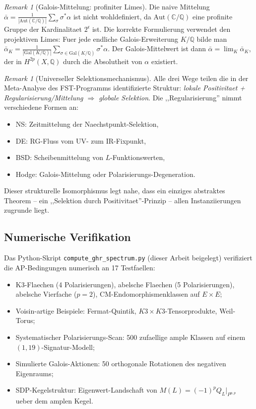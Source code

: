\documentclass[aps,prd,twocolumn,superscriptaddress,nofootinbib]{revtex4-2}
\theoremstyle{definition}
\theoremstyle{remark}
\newtheorem{remark}[theorem]{Remark}
\begin{document}
\begin{remark}[Galois-Mittelung: profiniter Limes]\label{rem:galois-profinite}
Die naive Mittelung $\bar{\alpha} = \frac{1}{|\mathrm{Aut}(\mathbb{C}/\mathbb{Q})|} \sum_\sigma \sigma^*\alpha$ ist nicht wohldefiniert, da $\mathrm{Aut}(\mathbb{C}/\mathbb{Q})$ eine profinite Gruppe der Kardinalitaet $2^{\mathfrak{c}}$ ist. Die korrekte Formulierung verwendet den projektiven Limes: Fuer jede endliche Galois-Erweiterung $K/\mathbb{Q}$ bilde man $\bar{\alpha}_K = \frac{1}{|\mathrm{Gal}(K/\mathbb{Q})|} \sum_{\sigma \in \mathrm{Gal}(K/\mathbb{Q})} \sigma^*\alpha$. Der Galois-Mittelwert ist dann $\bar{\alpha} = \lim_K \bar{\alpha}_K$, der in $H^{2p}(X, \mathbb{Q})$ durch die Absolutheit von $\alpha$ existiert.
\end{remark}

\begin{remark}[Universeller Selektionsmechanismus]
\label{rem:universal-selection}
Alle drei Wege teilen die in der Meta-Analyse des FST-Programms identifizierte Struktur: \emph{lokale Positivitaet + Regularisierung/Mittelung $\Rightarrow$ globale Selektion}. Die ,,Regularisierung'' nimmt verschiedene Formen an:
\begin{itemize}
\item NS: Zeitmittelung der Naechstpunkt-Selektion,
\item DE: RG-Fluss vom UV- zum IR-Fixpunkt,
\item BSD: Scheibenmittelung von $L$-Funktionswerten,
\item Hodge: Galois-Mittelung oder Polarisierungs-Degeneration.
\end{itemize}
Dieser strukturelle Isomorphismus legt nahe, dass ein einziges abstraktes Theorem -- ein ,,Selektion durch Positivitaet''-Prinzip -- allen Instanziierungen zugrunde liegt.
\end{remark}

\subsection{Numerische Verifikation}

Das Python-Skript \texttt{compute\_ghr\_spectrum.py} (dieser Arbeit beigelegt) verifiziert die AP-Bedingungen numerisch an 17 Testfaellen:
\begin{itemize}
\item K3-Flaechen (4 Polarisierungen), abelsche Flaechen (5 Polarisierungen), abelsche Vierfache ($p = 2$), CM-Endomorphismenklassen auf $E \times E$;
\item Voisin-artige Beispiele: Fermat-Quintik, $K3 \times K3$-Tensorprodukte, Weil-Torus;
\item Systematischer Polarisierungs-Scan: 500 zufaellige ample Klassen auf einem $(1, 19)$-Signatur-Modell;
\item Simulierte Galois-Aktionen: 50 orthogonale Rotationen des negativen Eigenraums;
\item SDP-Kegelstruktur: Eigenwert-Landschaft von $M(L) = (-1)^p Q_L|_{P^{p,p}}$ ueber dem amplen Kegel.
\end{itemize}
\end{document}
